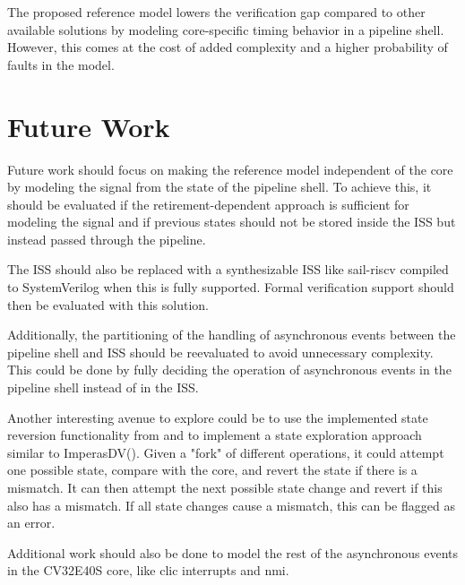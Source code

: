 The proposed reference model lowers the verification gap compared to other available solutions by modeling core-specific timing behavior in a pipeline shell. However, this comes at the cost of added complexity and a higher probability of faults in the model.


\section{Future Work}

Future work should focus on making the reference model independent of the core by modeling the  signal from the state of the pipeline shell. To achieve this, it should be evaluated if the retirement-dependent approach is sufficient for modeling the  signal and if previous states should not be stored inside the ISS but instead passed through the pipeline.

The ISS should also be replaced with a synthesizable ISS like sail-riscv compiled to SystemVerilog when this is fully supported. Formal verification support should then be evaluated with this solution.

Additionally, the partitioning of the handling of asynchronous events between the pipeline shell and ISS should be reevaluated to avoid unnecessary complexity. This could be done by fully deciding the operation of asynchronous events in the pipeline shell instead of in the ISS.

Another interesting avenue to explore could be to use the implemented state reversion functionality from   and  to implement a state exploration approach similar to ImperasDV().
Given a "fork" of different operations, it could attempt one possible state, compare with the core, and revert the state if there is a mismatch. It can then attempt the next possible state change and revert if this also has a mismatch. If all state changes cause a mismatch, this can be flagged as an error.

Additional work should also be done to model the rest of the asynchronous events in the CV32E40S core, like \acrshort{clic} interrupts and \acrlong{nmi}.



